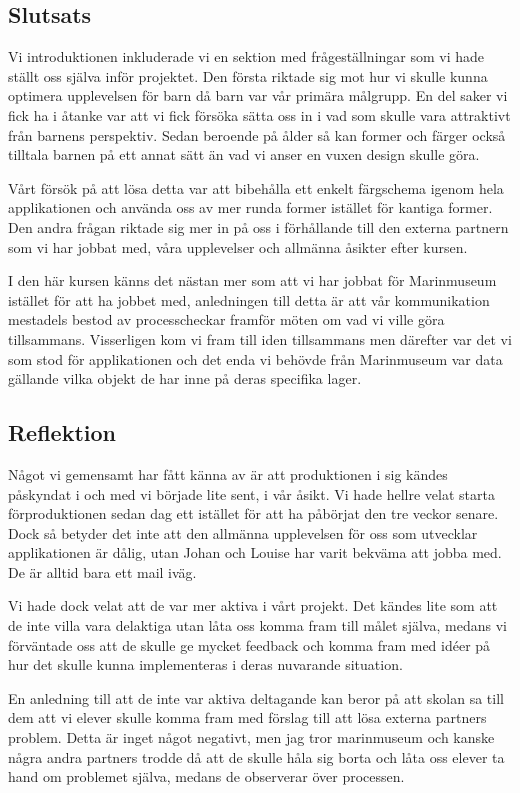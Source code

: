 \documentclass[12pt, titlepage]{article}
\begin{document}
\subsection{Slutsats}
Vi introduktionen inkluderade vi en sektion med frågeställningar som vi hade ställt oss själva inför projektet. 
Den första riktade sig mot hur vi skulle kunna optimera upplevelsen för barn då barn var vår primära målgrupp. 
En del saker vi fick ha i åtanke var att vi fick försöka sätta oss in i vad som skulle vara attraktivt från barnens perspektiv. 
Sedan beroende på ålder så kan former och färger också tilltala barnen på ett annat sätt än vad vi anser en vuxen design skulle göra.  

Vårt försök på att lösa detta var att bibehålla ett enkelt färgschema igenom hela applikationen och använda oss av mer runda former istället för kantiga former.
Den andra frågan riktade sig mer in på oss i förhållande till den externa partnern som vi har jobbat med, 
våra upplevelser och allmänna åsikter efter kursen.  

I den här kursen känns det nästan mer som att vi har jobbat för 
Marinmuseum istället för att ha jobbet med, anledningen till detta är att vår kommunikation mestadels bestod av processcheckar 
framför möten om vad vi ville göra tillsammans. Visserligen kom vi fram till iden tillsammans men därefter var det vi som stod 
för applikationen och det enda vi behövde från Marinmuseum var data gällande vilka objekt de har inne på deras specifika lager.

\subsection{Reflektion}
Något vi gemensamt har fått känna av är att produktionen i sig kändes påskyndat i och med vi började lite sent, 
i vår åsikt. Vi hade hellre velat starta förproduktionen sedan dag ett istället för att ha påbörjat den tre veckor senare. 
Dock så betyder det inte att den allmänna upplevelsen för oss som utvecklar applikationen är dålig, 
utan Johan och Louise har varit bekväma att jobba med. De är alltid bara ett mail iväg. 

Vi hade dock velat att de var mer aktiva i vårt projekt. Det kändes lite som att de inte villa vara delaktiga utan låta 
oss komma fram till målet själva, medans vi förväntade oss att de skulle ge mycket feedback och komma fram 
med idéer på hur det skulle kunna implementeras i deras nuvarande situation. 

En anledning till att de inte var aktiva deltagande 
kan beror på att skolan sa till dem att vi elever skulle komma fram med förslag till att lösa externa partners problem. 
Detta är inget något negativt, men jag tror marinmuseum och kanske några andra partners trodde då att de skulle 
håla sig borta och låta oss elever ta hand om problemet själva, medans de observerar över processen. 
\end{document}
